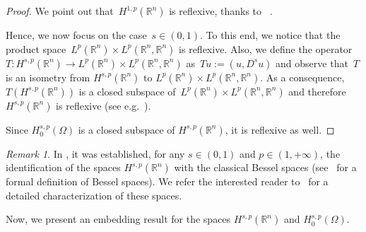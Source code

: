 \documentclass[11pt,hyp,]{nyjm}
\numberwithin{equation}{section}
\newcommand{\R}{\mathbb{R}}
\theoremstyle{remark}
\newtheorem{remark}[theorem]{Remark}
\begin{document}
\begin{proof}
We point out that~$H^{1,p}(\R^n)$ is reflexive, thanks to~ \cite[Proposition 8.1]{brezis}.

Hence, we now focus on the case~$s \in (0,1)$.
To this end,
we notice that the product space~$L^{p}(\R^n) \times L^p(\R^n,\R^n)$ is reflexive. Also, we define the operator~$T: H^{s,p}(\R^n) \to L^{p}(\R^n) \times L^p(\R^n,\R^n)$ as~$T u := (u, D^su)$ and observe that~$T$
is an isometry from $H^{s,p}(\R^n)$ to $L^{p}(\R^n) \times L^p(\R^n,\R^n)$.
As a consequence, $T(H^{s,p}(\R^n))$ is a closed subspace of~$L^{p}(\R^n) \times L^p(\R^n,\R^n)$ and
therefore~$H^{s,p}(\R^n)$ is reflexive
(see e.g.~\cite[Theorem~15 on page~82]{MR1892228}). 

Since $H^{s,p}_0(\Omega)$ is a closed subspace of $H^{s,p}(\R^n)$, it is reflexive as well.
\end{proof}

\begin{remark}
{I}n \cite[Theorem 1.7]{shieh}, it was established, for any $s \in (0,1)$ and $p \in (1,+\infty)$, the identification of the spaces $H^{s,p}(\R^n)$ with the classical Bessel spaces (see~\cite[Definition 2.1]{shieh} for a formal definition of Bessel spaces). We refer the interested reader to~\cite[Theorem 2.2]{shieh} for a detailed characterization of these spaces.
\end{remark}  	
			
{N}ow, we present an embedding result for the spaces $H^{s,p}(\R^n)$ and $H^{s,p}_0(\Omega)$.
\end{document}
